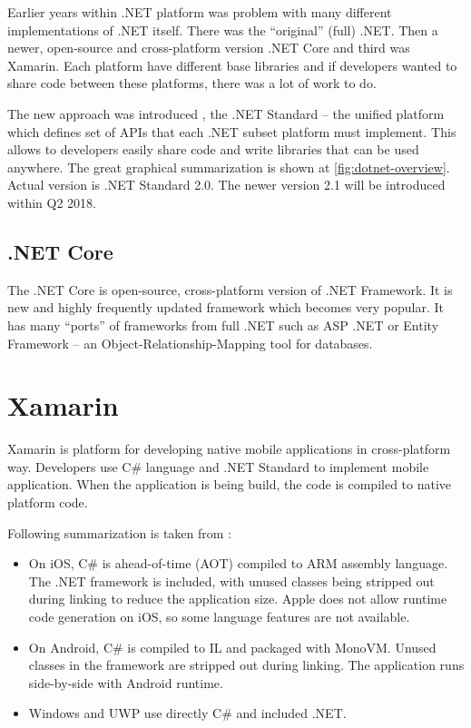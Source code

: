 Earlier years within .NET platform was problem with many different implementations of .NET itself. There was the ``original'' (full) .NET. Then a newer, open-source and cross-platform version .NET Core and third was Xamarin. Each platform have different base libraries and if developers wanted to share code between these platforms, there was a lot of work to do. 

The new approach was introduced \cite{introducing-dotnet-standard}, the .NET Standard -- the unified platform which defines set of APIs that each .NET subset platform must implement. This allows to developers easily share code and write libraries that can be used anywhere. The great graphical summarization is shown at \cref{fig:dotnet-overview}. Actual version is .NET Standard 2.0. The newer version 2.1 will be introduced within Q2 2018. 
\subsection{.NET Core}
The .NET Core is open-source, cross-platform version of .NET Framework. It is new and highly frequently updated framework which becomes very popular. It has many ``ports'' of frameworks from full .NET such as ASP .NET or Entity Framework -- an Object-Relationship-Mapping tool for databases. 
\section{Xamarin}
Xamarin is platform for developing native mobile applications in cross-platform way. Developers use C\# language and .NET Standard to implement mobile application. When the application is being build, the code is compiled to native platform code. 

Following summarization is taken from \cite{xamarin-understand-platform}:
\begin{itemize}
\item On iOS, C\# is ahead-of-time (AOT) compiled to ARM assembly language. The .NET framework is included, with unused classes being stripped out during linking to reduce the application size. Apple does not allow runtime code generation on iOS, so some language features are not available.
\item On Android, C\# is compiled to IL and packaged with MonoVM. Unused classes in the framework are stripped out during linking. The application runs side-by-side with Android runtime.
\item Windows and UWP use directly C\# and included .NET. 
\end{itemize}

